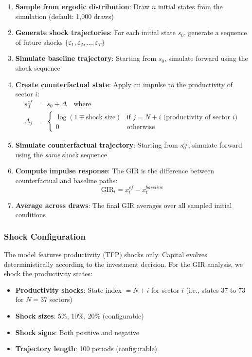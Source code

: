 \documentclass[11pt]{article}
\begin{document}
\begin{enumerate}
    \item \textbf{Sample from ergodic distribution}: Draw $n$ initial states from the simulation (default: 1,000 draws)
    
    \item \textbf{Generate shock trajectories}: For each initial state $s_0$, generate a sequence of future shocks $\{\varepsilon_1, \varepsilon_2, \ldots, \varepsilon_T\}$
    
    \item \textbf{Simulate baseline trajectory}: Starting from $s_0$, simulate forward using the shock sequence
    
    \item \textbf{Create counterfactual state}: Apply an impulse to the productivity of sector $i$:
    \begin{align}
        s_0^{cf} &= s_0 + \Delta \quad \text{where} \\
        \Delta_j &= \begin{cases}
            \log(1 \mp \text{shock\_size}) & \text{if } j = N + i \text{ (productivity of sector } i\text{)} \\
            0 & \text{otherwise}
        \end{cases}
    \end{align}
    
    \item \textbf{Simulate counterfactual trajectory}: Starting from $s_0^{cf}$, simulate forward using the \textit{same} shock sequence
    
    \item \textbf{Compute impulse response}: The GIR is the difference between counterfactual and baseline paths:
    \begin{equation}
        \text{GIR}_t = x_t^{cf} - x_t^{baseline}
    \end{equation}
    
    \item \textbf{Average across draws}: The final GIR averages over all sampled initial conditions
\end{enumerate}

\subsubsection{Shock Configuration}
The model features productivity (TFP) shocks only. Capital evolves deterministically according to the investment decision. For the GIR analysis, we shock the productivity states:
\begin{itemize}
    \item \textbf{Productivity shocks}: State index $= N + i$ for sector $i$ (i.e., states 37 to 73 for $N=37$ sectors)
    \item \textbf{Shock sizes}: 5\%, 10\%, 20\% (configurable)
    \item \textbf{Shock signs}: Both positive and negative
    \item \textbf{Trajectory length}: 100 periods (configurable)
\end{itemize}
\end{document}
